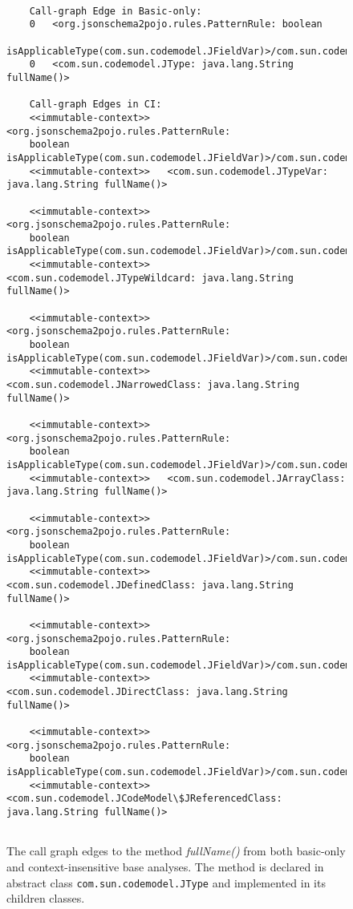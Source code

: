 \begin{figure}
	\begin{lstlisting}[basicstyle=\ttfamily\scriptsize, numbers=none, framesep=4.5mm, framexleftmargin=1.0mm, captionpos=b, escapechar=|]
	
	Call-graph Edge in Basic-only:
	0	<org.jsonschema2pojo.rules.PatternRule: boolean 
	isApplicableType(com.sun.codemodel.JFieldVar)>/com.sun.codemodel.JClass.fullName/0	
	0	<com.sun.codemodel.JType: java.lang.String fullName()>
	
	Call-graph Edges in CI:
	<<immutable-context>>	<org.jsonschema2pojo.rules.PatternRule: 
	boolean isApplicableType(com.sun.codemodel.JFieldVar)>/com.sun.codemodel.JClass.fullName/0
	<<immutable-context>>	<com.sun.codemodel.JTypeVar: java.lang.String fullName()>
	
	<<immutable-context>>	<org.jsonschema2pojo.rules.PatternRule: 
	boolean isApplicableType(com.sun.codemodel.JFieldVar)>/com.sun.codemodel.JClass.fullName/0	
	<<immutable-context>>	<com.sun.codemodel.JTypeWildcard: java.lang.String fullName()>
	
	<<immutable-context>>	<org.jsonschema2pojo.rules.PatternRule: 
	boolean isApplicableType(com.sun.codemodel.JFieldVar)>/com.sun.codemodel.JClass.fullName/0	
	<<immutable-context>>	<com.sun.codemodel.JNarrowedClass: java.lang.String fullName()>
	
	<<immutable-context>>	<org.jsonschema2pojo.rules.PatternRule: 
	boolean isApplicableType(com.sun.codemodel.JFieldVar)>/com.sun.codemodel.JClass.fullName/0	
	<<immutable-context>>	<com.sun.codemodel.JArrayClass: java.lang.String fullName()>
	
	<<immutable-context>>	<org.jsonschema2pojo.rules.PatternRule: 
	boolean isApplicableType(com.sun.codemodel.JFieldVar)>/com.sun.codemodel.JClass.fullName/0	
	<<immutable-context>>	<com.sun.codemodel.JDefinedClass: java.lang.String fullName()>
	
	<<immutable-context>>	<org.jsonschema2pojo.rules.PatternRule: 
	boolean isApplicableType(com.sun.codemodel.JFieldVar)>/com.sun.codemodel.JClass.fullName/0	
	<<immutable-context>>	<com.sun.codemodel.JDirectClass: java.lang.String fullName()>
	
	<<immutable-context>>	<org.jsonschema2pojo.rules.PatternRule: 
	boolean isApplicableType(com.sun.codemodel.JFieldVar)>/com.sun.codemodel.JClass.fullName/0	
	<<immutable-context>>	<com.sun.codemodel.JCodeModel\$JReferencedClass: java.lang.String fullName()>
	
	\end{lstlisting}
	\caption{The call graph edges to the method \textit{fullName()} from both basic-only and context-insensitive base analyses. The method is declared in abstract class \texttt{com.sun.codemodel.JType} and implemented in its children classes.}
	\label{fig:edgesToSiblingMethod}
	
\end{figure}

